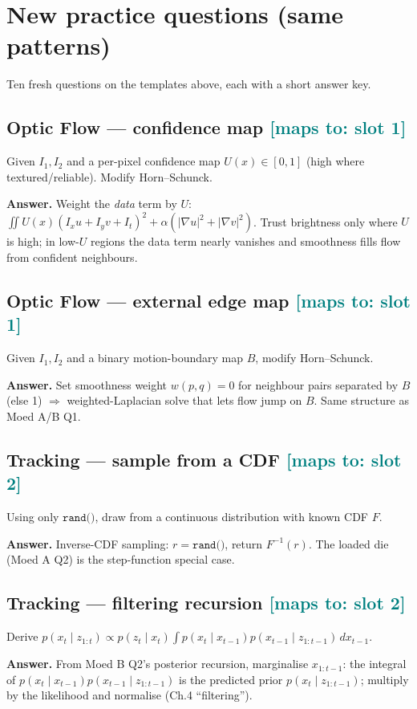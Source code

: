 \documentclass[11pt]{article}
\newcommand{\maps}[1]{{\small\textcolor{teal}{[maps to: #1]}}}
\newcommand{\ans}[1]{\begin{answer}\textbf{Answer.} #1\end{answer}}
\begin{document}
\section{New practice questions (same patterns)}
Ten fresh questions on the templates above, each with a short answer key.

\subsection{Optic Flow --- confidence map \hfill \maps{slot 1}}
Given $I_1,I_2$ and a per-pixel confidence map $U(x)\in[0,1]$ (high where textured/reliable). Modify Horn--Schunck.
\ans{Weight the \emph{data} term by $U$: $\iint U(x)(I_xu+I_yv+I_t)^2+\alpha(|\nabla u|^2+|\nabla v|^2)$. Trust
brightness only where $U$ is high; in low-$U$ regions the data term nearly vanishes and smoothness fills flow from
confident neighbours.}

\subsection{Optic Flow --- external edge map \hfill \maps{slot 1}}
Given $I_1,I_2$ and a binary motion-boundary map $B$, modify Horn--Schunck.
\ans{Set smoothness weight $w(p,q)=0$ for neighbour pairs separated by $B$ (else 1) $\Rightarrow$ weighted-Laplacian
solve that lets flow jump on $B$. Same structure as Moed A/B Q1.}

\subsection{Tracking --- sample from a CDF \hfill \maps{slot 2}}
Using only $\texttt{rand()}$, draw from a continuous distribution with known CDF $F$.
\ans{Inverse-CDF sampling: $r=\texttt{rand()}$, return $F^{-1}(r)$. The loaded die (Moed A Q2) is the step-function
special case.}

\subsection{Tracking --- filtering recursion \hfill \maps{slot 2}}
Derive $p(x_t\mid z_{1:t})\propto p(z_t\mid x_t)\int p(x_t\mid x_{t-1})p(x_{t-1}\mid z_{1:t-1})\,dx_{t-1}$.
\ans{From Moed B Q2's posterior recursion, marginalise $x_{1:t-1}$: the integral of
$p(x_t\mid x_{t-1})p(x_{t-1}\mid z_{1:t-1})$ is the predicted prior $p(x_t\mid z_{1:t-1})$; multiply by the
likelihood and normalise (Ch.4 ``filtering'').}
\end{document}

